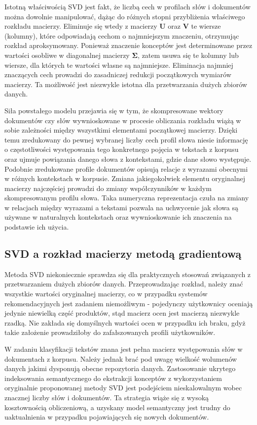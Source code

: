 \documentclass{pracamgr}
\begin{document}
Istotną właściwością SVD jest fakt, że liczbą cech w profilach słów i dokumentów można dowolnie manipulować, dążąc do różnych stopni przybliżenia właściwego rozkładu macierzy. Eliminuje się wtedy z macierzy $\mathbf{U}$ oraz $\mathbf{V}$ te wiersze (kolumny), które odpowiadają cechom o najmniejszym znaczeniu, otrzymując rozkład aproksymowany. Ponieważ znaczenie konceptów jest determinowane przez wartości osobliwe w diagonalnej macierzy $\mathbf{\Sigma}$, zatem usuwa się te kolumny lub wiersze, dla których te wartości własne są najmniejsze. Eliminacja najmniej znaczących cech prowadzi do zasadniczej redukcji początkowych wymiarów macierzy. Ta możliwość jest niezwykle istotna dla przetwarzania dużych zbiorów danych.

Siła powstałego modelu przejawia się w tym, że skompresowane wektory dokumentów czy słów wywnioskowane w procesie obliczania rozkładu wiążą w sobie zależności między wszystkimi elementami początkowej macierzy. Dzięki temu zredukowany do pewnej wybranej liczby cech profil słowa niesie informację o częstotliwości występowania tego konkretnego pojęcia w tekstach z korpusu oraz ujmuje powiązania danego słowa z kontekstami, gdzie dane słowo występuje. Podobnie zredukowane profile dokumentów opisują relacje z wyrazami obecnymi w różnych kontekstach w korpusie. Zmiana jakiegokolwiek elementu oryginalnej macierzy najczęściej prowadzi do zmiany współczynników w każdym skompresowanym profilu słowa. Taka numeryczna reprezentacja czuła na zmiany w relacjach między wyrazami a tekstami pozwala na uchwycenie jak słowa są używane w naturalnych kontekstach oraz wywnioskowanie ich znaczenia na podstawie ich użycia.

\subsection{SVD a rozkład macierzy metodą gradientową}
Metoda SVD niekoniecznie sprawdza się dla praktycznych stosowań związanych z przetwarzaniem dużych zbiorów danych. Przeprowadzając rozkład, należy znać wszystkie wartości oryginalnej macierzy, co w przypadku systemów rekomendacyjnych jest zadaniem niemożliwym - pojedynczy użytkownicy oceniają jedynie niewielką część produktów, stąd macierz ocen jest macierzą niezwykle rzadką. Nie zakłada się domyślnych wartości ocen w przypadku ich braku, gdyż takie założenie prowadziłoby do zafałszowanych profili użytkowników. 

W zadaniu klasyfikacji tekstów znana jest pełna macierz występowania słów w dokumentach z korpusu. Należy jednak brać pod uwagę wielkość wolumenów danych jakimi dysponują obecne repozytoria danych. Zastosowanie ukrytego indeksowania semantycznego do ekstrakcji konceptów z wykorzystaniem oryginalnie proponowanej metody SVD jest podejściem nieskalowalnym wobec znacznej liczby słów i dokumentów. Ta strategia wiąże się z wysoką kosztownością obliczeniową, a uzyskany model semantyczny jest trudny do uaktualnienia w przypadku pojawiających się nowych dokumentów.
\end{document}
